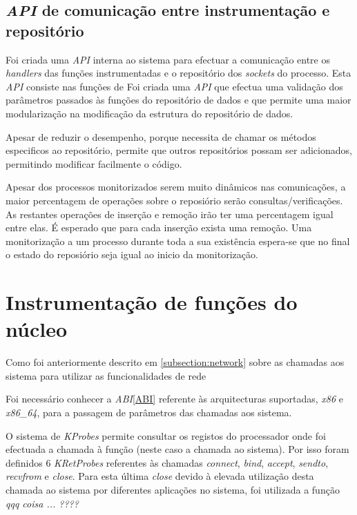 \subsection{\textit{API} de comunicação entre instrumentação e repositório}

Foi criada uma \textit{API} interna ao sistema para efectuar a comunicação entre os \textit{handlers} das funções instrumentadas e o repositório dos \textit{sockets} do processo.
 Esta \textit{API} consiste nas funções de 
 Foi criada uma \textit{API} que efectua uma validação dos parâmetros passados às funções do repositório de dados e que permite uma maior modularização na modificação da estrutura do repositório de dados.

Apesar de reduzir o desempenho, porque necessita de chamar os métodos especificos ao repositório, permite que outros repositórios possam ser adicionados, permitindo modificar facilmente o código.

Apesar dos processos monitorizados serem muito dinâmicos nas comunicações, a maior percentagem de operações sobre o reposiório serão consultas/verificações.
 As restantes operações de inserção e remoção irão ter uma percentagem igual entre elas.
 É esperado que para cada inserção exista uma remoção.
 Uma monitorização a um processo durante toda a sua existência espera-se que no final o estado do reposiório seja igual ao inicio da monitorização.

\section{Instrumentação de funções do núcleo}

Como foi anteriormente descrito em \ref{subsection:network} sobre as chamadas aos sistema para utilizar as funcionalidades de rede

Foi necessário conhecer a \textit{ABI}\ref{ABI}\cite{ABI} referente às arquitecturas suportadas, \textit{x86} e \textit{x86\_64}, para a passagem de parâmetros das chamadas aos sistema.

O sistema de \textit{KProbes} permite consultar os registos do processador onde foi efectuada a chamada à função (neste caso a chamada ao sistema).
 Por isso foram definidos 6 \textit{KRetProbes} referentes às chamadas \textit{connect}, \textit{bind}, \textit{accept}, \textit{sendto}, \textit{recvfrom} e
\textit{close}.
 Para esta última \textit{close} devido à elevada utilização desta chamada ao sistema por diferentes aplicações no sistema, foi utilizada a função \textit{qqq coisa ...  ????}

